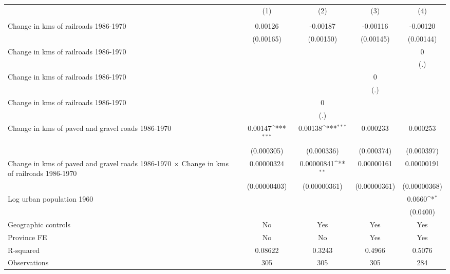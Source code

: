 {
\def\sym#1{\ifmmode^{#1}\else\(^{#1}\)\fi}
\begin{tabular}{l*{4}{c}}
\hline\hline
                &\multicolumn{1}{c}{(1)}&\multicolumn{1}{c}{(2)}&\multicolumn{1}{c}{(3)}&\multicolumn{1}{c}{(4)}\\
                &\multicolumn{1}{c}{}&\multicolumn{1}{c}{}&\multicolumn{1}{c}{}&\multicolumn{1}{c}{}\\
\hline
Change in kms of railroads 1986-1970&  0.00126         & -0.00187         & -0.00116         & -0.00120         \\
                &(0.00165)         &(0.00150)         &(0.00145)         &(0.00144)         \\
[1em]
Change in kms of railroads 1986-1970&                  &                  &                  &        0         \\
                &                  &                  &                  &      (.)         \\
[1em]
Change in kms of railroads 1986-1970&                  &                  &        0         &                  \\
                &                  &                  &      (.)         &                  \\
[1em]
Change in kms of railroads 1986-1970&                  &        0         &                  &                  \\
                &                  &      (.)         &                  &                  \\
[1em]
Change in kms of paved and gravel roads 1986-1970&  0.00147\sym{***}&  0.00138\sym{***}& 0.000233         & 0.000253         \\
                &(0.000305)         &(0.000336)         &(0.000374)         &(0.000397)         \\
[1em]
Change in kms of paved and gravel roads 1986-1970 $\times$ Change in kms of railroads 1986-1970&0.00000324         &0.00000841\sym{**} &0.00000161         &0.00000191         \\
                &(0.00000403)         &(0.00000361)         &(0.00000361)         &(0.00000368)         \\
[1em]
Log urban population 1960&                  &                  &                  &   0.0660\sym{*}  \\
                &                  &                  &                  & (0.0400)         \\
\hline
Geographic controls&       No         &      Yes         &      Yes         &      Yes         \\
Province FE     &       No         &       No         &      Yes         &      Yes         \\
R-squared       &  0.08622         &   0.3243         &   0.4966         &   0.5076         \\
Observations    &      305         &      305         &      305         &      284         \\
\hline\hline
\end{tabular}
}
